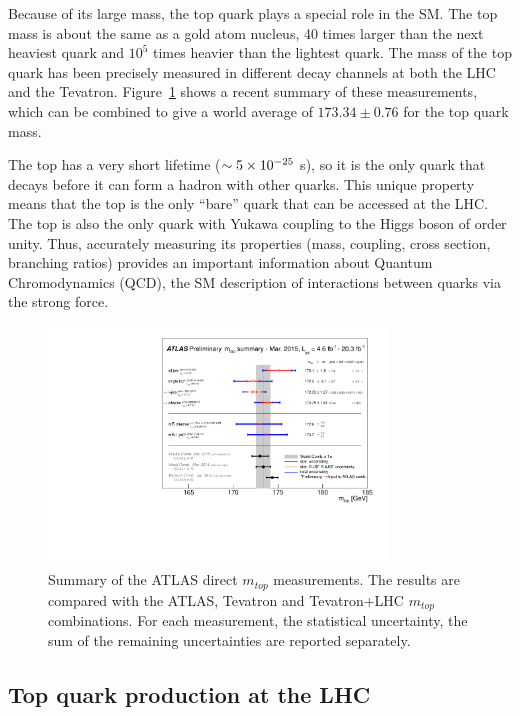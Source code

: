 Because of its large mass, the top quark plays a special role in the SM. The top mass is about the same as a gold atom nucleus, 40 times larger than the next heaviest quark and $10^5$ times heavier than the lightest quark. The mass of the top quark has been precisely measured in different decay channels at both the LHC and the Tevatron. Figure~\ref{fig:topmass} shows a recent summary of these measurements, which can be combined to give a world average of $173.34 \pm 0.76$ for the top quark mass.

 The top has a very short lifetime ($\sim 5 \times 10^{-25}$ s), so it is the only quark that decays before it can form a hadron with other quarks. This unique property means that the top is the only ``bare'' quark that can be accessed at the LHC. The top is also the only quark with Yukawa coupling to the Higgs boson of order unity. Thus, accurately measuring its properties (mass, coupling, cross section, branching ratios) provides an important information about Quantum Chromodynamics (QCD), the SM description of interactions between quarks via the strong force. 



\begin{figure}
\centering
\includegraphics[width=0.8\textwidth]{fig/thry/mtopSummaryAll.pdf}
\caption{Summary of the ATLAS direct $m_{top}$ measurements. The results are compared with the ATLAS, Tevatron and Tevatron+LHC $m_{top}$ combinations. For each measurement, the statistical uncertainty, the sum of the remaining uncertainties are reported separately.}
\label{fig:topmass}
\end{figure}

\subsection{Top quark production at the LHC}

